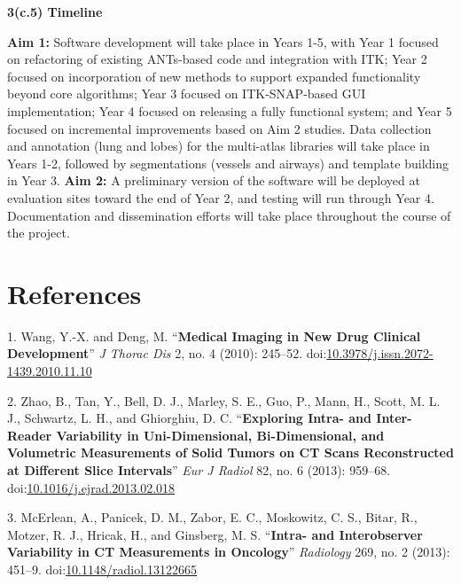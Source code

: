 \documentclass[11pt,]{article}
\begin{document}
\textbf{3(c.5) Timeline}

\textbf{Aim 1:} Software development will take place in Years 1-5, with
Year 1 focused on refactoring of existing ANTs-based code and
integration with ITK; Year 2 focused on incorporation of new methods to
support expanded functionality beyond core algorithms; Year 3 focused on
ITK-SNAP-based GUI implementation; Year 4 focused on releasing a fully
functional system; and Year 5 focused on incremental improvements based
on Aim 2 studies. Data collection and annotation (lung and lobes) for
the multi-atlas libraries will take place in Years 1-2, followed by
segmentations (vessels and airways) and template building in Year 3.
\textbf{Aim 2:} A preliminary version of the software will be deployed
at evaluation sites toward the end of Year 2, and testing will run
through Year 4. Documentation and dissemination efforts will take place
throughout the course of the project.

\clearpage

\newpage

\section*{References}\label{references}

\hypertarget{refs}{}
\hypertarget{ref-Wang:2010aa}{}
1. Wang, Y.-X. and Deng, M. ``\textbf{Medical Imaging in New Drug
Clinical Development}'' \emph{J Thorac Dis} 2, no. 4 (2010): 245--52.
doi:\href{https://doi.org/10.3978/j.issn.2072-1439.2010.11.10}{10.3978/j.issn.2072-1439.2010.11.10}

\hypertarget{ref-Zhao:2013aa}{}
2. Zhao, B., Tan, Y., Bell, D. J., Marley, S. E., Guo, P., Mann, H.,
Scott, M. L. J., Schwartz, L. H., and Ghiorghiu, D. C.
``\textbf{Exploring Intra- and Inter-Reader Variability in
Uni-Dimensional, Bi-Dimensional, and Volumetric Measurements of Solid
Tumors on CT Scans Reconstructed at Different Slice Intervals}''
\emph{Eur J Radiol} 82, no. 6 (2013): 959--68.
doi:\href{https://doi.org/10.1016/j.ejrad.2013.02.018}{10.1016/j.ejrad.2013.02.018}

\hypertarget{ref-McErlean:2013aa}{}
3. McErlean, A., Panicek, D. M., Zabor, E. C., Moskowitz, C. S., Bitar,
R., Motzer, R. J., Hricak, H., and Ginsberg, M. S. ``\textbf{Intra- and
Interobserver Variability in CT Measurements in Oncology}''
\emph{Radiology} 269, no. 2 (2013): 451--9.
doi:\href{https://doi.org/10.1148/radiol.13122665}{10.1148/radiol.13122665}
\end{document}
